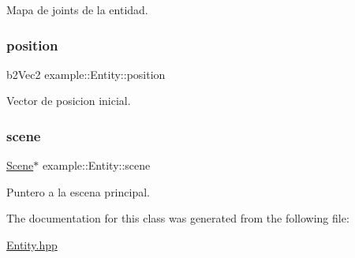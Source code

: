 Mapa de joints de la entidad. 

\mbox{\label{classexample_1_1_entity_abfa8b41527466a41500b59393faec19a}} 
\subsubsection{\texorpdfstring{position}{position}}
{\footnotesize\ttfamily b2\+Vec2 example\+::\+Entity\+::position\hspace{0.3cm}{\ttfamily [protected]}}



Vector de posicion inicial. 

\mbox{\label{classexample_1_1_entity_ab851dbde4a16829f9fb77ab9a66b9f1e}} 
\subsubsection{\texorpdfstring{scene}{scene}}
{\footnotesize\ttfamily \mbox{\hyperlink{classexample_1_1_scene}{Scene}}$\ast$ example\+::\+Entity\+::scene\hspace{0.3cm}{\ttfamily [protected]}}



Puntero a la escena principal. 



The documentation for this class was generated from the following file\+:\begin{DoxyCompactItemize}
\item 
\mbox{\hyperlink{_entity_8hpp}{Entity.\+hpp}}\end{DoxyCompactItemize}
